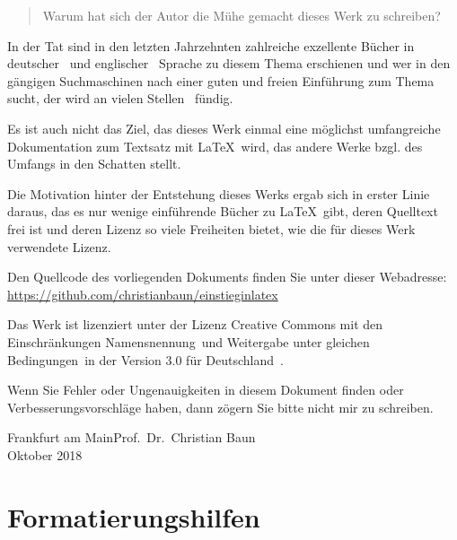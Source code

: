 \documentclass[a4paper,10pt,twoside]{scrbook}
\begin{document}
\begin{quote}
\glqq Warum hat sich der Autor die Mühe gemacht dieses Werk zu schreiben?\grqq
\end{quote}

In der Tat sind in den letzten Jahrzehnten zahlreiche exzellente Bücher in deutscher~\cite{Kopka2000,GoossensMittelachSamarin2000,voss2016einfuhrung} und englischer~\cite{mittelbach2004latex,kopka2003guide} Sprache zu diesem Thema erschienen und wer in den gängigen Suchmaschinen nach einer guten und freien Einführung zum Thema sucht, der wird an vielen Stellen~\cite{KrauseLink,JuergensFeuerstackLink,RichterTorstenLink,MarxBueckerLink,NagelLink,GitterLink} fündig.

Es ist auch nicht das Ziel, das dieses Werk einmal eine möglichst umfangreiche Dokumentation zum Textsatz mit \LaTeX\ wird, das andere Werke bzgl. des Umfangs in den Schatten stellt. 

Die Motivation hinter der Entstehung dieses Werks ergab sich in erster Linie daraus, das es nur wenige einführende Bücher zu \LaTeX\ gibt, deren Quelltext frei ist und deren Lizenz so viele Freiheiten bietet, wie die für dieses Werk verwendete Lizenz.

Den Quellcode des vorliegenden Dokuments finden Sie unter dieser Webadresse:\\
\url{https://github.com/christianbaun/einstieginlatex}

Das Werk ist lizenziert unter der Lizenz Creative Commons mit den Einschränkungen \glqq Namensnennung\grqq\ und \glqq Weitergabe unter gleichen Bedingungen\grqq\ in der Version 3.0 für Deutschland~\cite{CC-BY-SA-3.0License}.

Wenn Sie Fehler oder Ungenauigkeiten in diesem Dokument finden oder Verbesserungsvorschläge haben, dann zögern Sie bitte nicht mir zu schreiben. 

\begin{flushright} 
Frankfurt am Main\hfill Prof.~Dr.~Christian Baun\\
Oktober 2018
\end{flushright}

\mainmatter        %


\mainmatter









\chapter{Formatierungshilfen}
\label{KapitelFormatierungshilfen}
\end{document}
